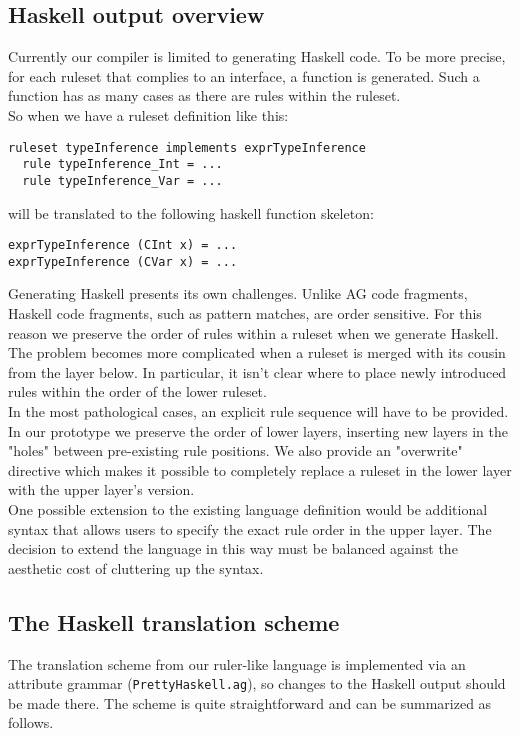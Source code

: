 \documentclass[10pt]{article}
\begin{document}
\subsection{Haskell output overview}
Currently our compiler is limited to generating Haskell code. To be more precise, for each ruleset that complies to an interface, a function is generated. Such a function has as many cases as there are rules within the ruleset.\\

So when we have a ruleset definition like this:
\begin{verbatim}
ruleset typeInference implements exprTypeInference
  rule typeInference_Int = ...
  rule typeInference_Var = ...
\end{verbatim}

will be translated to the following haskell function skeleton:
\begin{verbatim}
exprTypeInference (CInt x) = ...
exprTypeInference (CVar x) = ...
\end{verbatim}


Generating Haskell presents its own challenges.  Unlike AG code fragments, Haskell 
code fragments, such as pattern matches, are order sensitive.  For this reason we preserve
the order of rules within a ruleset when we generate Haskell.  The problem becomes more 
complicated when a ruleset is merged with its cousin from the layer below.  In particular,
it isn't clear where to place newly introduced rules within the order of the lower ruleset.\\

In the most pathological cases, an explicit rule sequence will have to be provided.   In 
our prototype we preserve the order of lower layers, inserting new layers in the "holes"
between pre-existing rule positions.  We also provide an "overwrite" directive which 
makes it possible to completely replace a ruleset in the lower layer with the upper layer's
version.  \\

One possible extension to the existing language definition would be additional syntax
that allows users to specify the exact rule order in the upper layer.  The decision to 
extend the language in this way must be balanced against the aesthetic cost of 
cluttering up the syntax. 


\subsection{The Haskell translation scheme}
The translation scheme from our ruler-like language is implemented via an attribute
grammar (\texttt{PrettyHaskell.ag}), so changes to the Haskell output should be made 
there.  The scheme is quite straightforward and can be summarized as follows. \\
\end{document}
